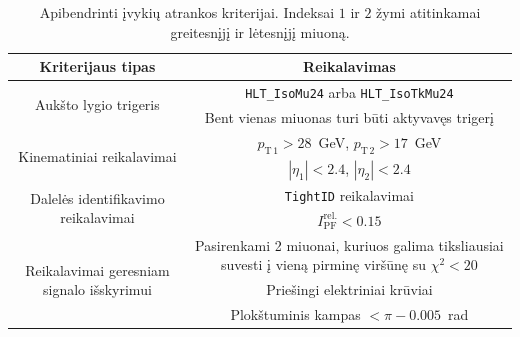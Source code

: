 \documentclass[a4paper, 12pt, oneside]{article}
\newcommand{\ttt}[1]{\texttt{#1}}
\begin{document}
\begin{table}[b!]
	\begin{tabular}{|c|c|}
		\hline
		\textbf{Kriterijaus tipas} & \textbf{Reikalavimas} \\
		\hline\hline
		\multirow{3}{12em}{\centering Aukšto lygio trigeris} & \ttt{HLT\_IsoMu24} arba \ttt{HLT\_IsoTkMu24} \\ \cline{2-2}
			& \multirow{2}{17em}{\centering Bent vienas miuonas turi būti aktyvavęs trigerį} \\
		 & \\
		\hline\hline
		\multirow{2}{12em}{\centering Kinematiniai reikalavimai} & $p_{\mathrm{T \, 1}} > 28$~GeV, $p_{\mathrm{T \, 2}} > 17$~GeV \\ \cline{2-2}
		 & $|\eta_1| < 2.4$, $|\eta_2| < 2.4$ \\
		\hline\hline
		\multirow{2}{12em}{\centering Dalelės identifikavimo reikalavimai} & \ttt{TightID} reikalavimai \\ \cline{2-2}
		 & $I_{\mathrm{PF}}^{\mathrm{rel.}}<0.15$ \\
		\hline\hline
		\multirow{5}{12em}{\centering Reikalavimai geresniam signalo išskyrimui} &
			\multirow{3}{17em}{\centering Pasirenkami 2 miuonai, kuriuos galima tiksliausiai suvesti į vieną pirminę viršūnę su $\chi^2<20$} \\
		 & \\
		 & \\ \cline{2-2}
		 & Priešingi elektriniai krūviai \\ \cline{2-2}
		 & Plokštuminis kampas $< \pi - 0.005$~rad \\
		\hline
	\end{tabular}
	\caption{\label{table:selection}Apibendrinti įvykių atrankos kriterijai. Indeksai $1$ ir $2$ žymi atitinkamai greitesnįjį
	ir lėtesnįjį miuoną.}
\end{table}
\end{document}
